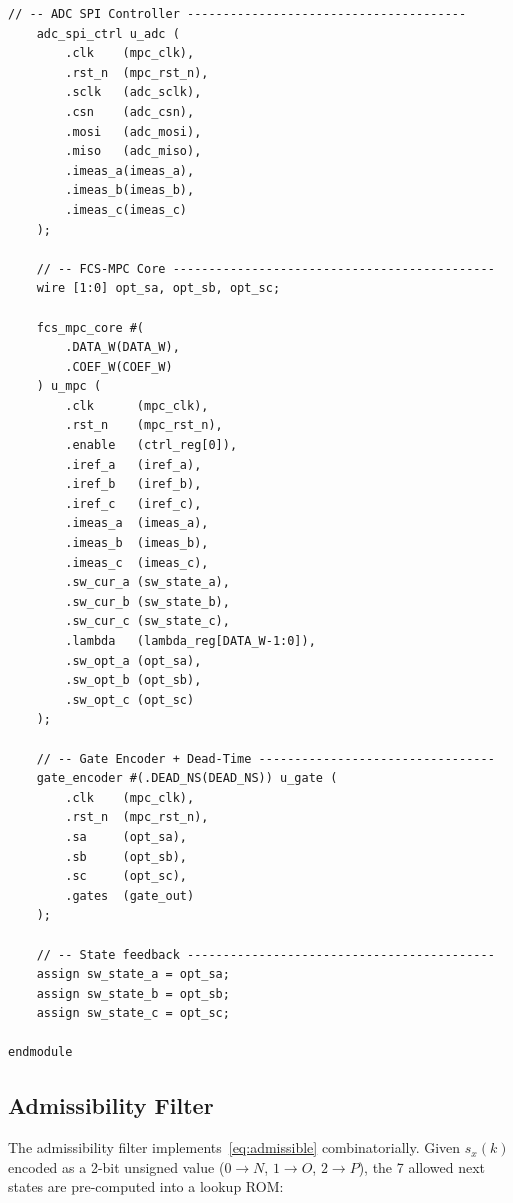 \documentclass[11pt,a4paper]{article}
\begin{document}
\begin{lstlisting}[style=verilog, caption={Top-level Verilog module skeleton
  for the FCS-MPC IP core.}, label={lst:top}]
    // -- ADC SPI Controller ---------------------------------------
    adc_spi_ctrl u_adc (
        .clk    (mpc_clk),
        .rst_n  (mpc_rst_n),
        .sclk   (adc_sclk),
        .csn    (adc_csn),
        .mosi   (adc_mosi),
        .miso   (adc_miso),
        .imeas_a(imeas_a),
        .imeas_b(imeas_b),
        .imeas_c(imeas_c)
    );

    // -- FCS-MPC Core ---------------------------------------------
    wire [1:0] opt_sa, opt_sb, opt_sc;

    fcs_mpc_core #(
        .DATA_W(DATA_W),
        .COEF_W(COEF_W)
    ) u_mpc (
        .clk      (mpc_clk),
        .rst_n    (mpc_rst_n),
        .enable   (ctrl_reg[0]),
        .iref_a   (iref_a),
        .iref_b   (iref_b),
        .iref_c   (iref_c),
        .imeas_a  (imeas_a),
        .imeas_b  (imeas_b),
        .imeas_c  (imeas_c),
        .sw_cur_a (sw_state_a),
        .sw_cur_b (sw_state_b),
        .sw_cur_c (sw_state_c),
        .lambda   (lambda_reg[DATA_W-1:0]),
        .sw_opt_a (opt_sa),
        .sw_opt_b (opt_sb),
        .sw_opt_c (opt_sc)
    );

    // -- Gate Encoder + Dead-Time ---------------------------------
    gate_encoder #(.DEAD_NS(DEAD_NS)) u_gate (
        .clk    (mpc_clk),
        .rst_n  (mpc_rst_n),
        .sa     (opt_sa),
        .sb     (opt_sb),
        .sc     (opt_sc),
        .gates  (gate_out)
    );

    // -- State feedback -------------------------------------------
    assign sw_state_a = opt_sa;
    assign sw_state_b = opt_sb;
    assign sw_state_c = opt_sc;

endmodule
\end{lstlisting}

\subsection{Admissibility Filter}
\label{sec:admfilt}

The admissibility filter implements~\eqref{eq:admissible} combinatorially.
Given $s_x(k)$ encoded as a 2-bit unsigned value ($0\to N$, $1\to O$,
$2\to P$), the 7 allowed next states are pre-computed into a lookup ROM:
\end{document}
